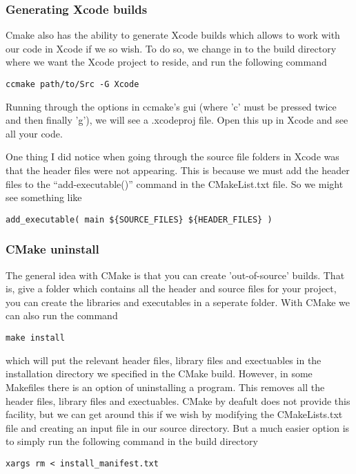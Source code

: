 \documentclass[a4paper, 10pt]{article}
\begin{document}
\subsubsection*{Generating Xcode builds}
\label{sec:gener-xcode-builds}

Cmake also has the ability to generate Xcode builds which allows to
work with our code in Xcode if we so wish. To do so, we change in to
the build directory where we want the Xcode project to reside, and run
the following command 
\begin{verbatim}
ccmake path/to/Src -G Xcode
\end{verbatim}
Running through the options in ccmake's gui (where 'c' must be pressed twice
and then finally 'g'), we will see a .xcodeproj file. Open this up in
Xcode and see all your code.

One thing I did notice when going through the source file folders in
Xcode was that the header files were not appearing. This is because we
must add the header files to the ``add-executable()'' command in the
CMakeList.txt file. So we might see something like
\begin{verbatim}
add_executable( main ${SOURCE_FILES} ${HEADER_FILES} )
\end{verbatim}

\subsubsection*{CMake uninstall}
\label{sec:cmake-uninstall}

The general idea with CMake is that you can create 'out-of-source'
builds. That is, give a folder which contains all the header and
source files for your project, you can create the libraries and
executables in a seperate folder. With CMake we can also run the
command
\begin{verbatim}
make install
\end{verbatim}
which will put the relevant header files, library files and
exectuables in the installation directory we specified in the CMake
build. However, in some Makefiles there is an option of uninstalling a
program. This removes all the header files, library files and
exectuables. CMake by deafult does not provide this facility, but we
can get around this if we wish by modifying the CMakeLists.txt file
and creating an input file in our source directory. But a much easier
option is to simply run the following command in the build directory
\begin{verbatim}
xargs rm < install_manifest.txt 
\end{verbatim}
\end{document}
